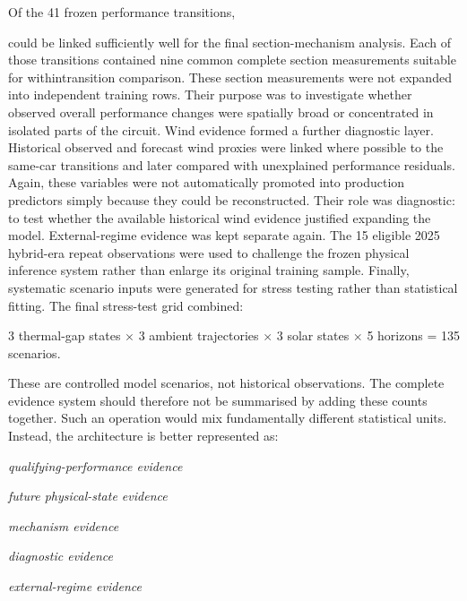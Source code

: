 Of the 41 frozen performance transitions,

could be linked sufficiently well for the final section-mechanism analysis. Each of those transitions contained nine common complete section measurements suitable for withintransition comparison. These section measurements were not expanded into independent training rows. Their purpose was to investigate whether observed overall performance changes were spatially broad or concentrated in isolated parts of the circuit. Wind evidence formed a further diagnostic layer. Historical observed and forecast wind proxies were linked where possible to the same-car transitions and later compared with unexplained performance residuals. Again, these variables were not automatically promoted into production predictors simply because they could be reconstructed. Their role was diagnostic: to test whether the available historical wind evidence justified expanding the model. External-regime evidence was kept separate again. The 15 eligible 2025 hybrid-era repeat observations were used to challenge the frozen physical inference system rather than enlarge its original training sample. Finally, systematic scenario inputs were generated for stress testing rather than statistical fitting. The final stress-test grid combined:

3 thermal-gap states \ensuremath{\times} 3 ambient trajectories \ensuremath{\times} 3 solar states \ensuremath{\times} 5 horizons = 135 scenarios.

These are controlled model scenarios, not historical observations. The complete evidence system should therefore not be summarised by adding these counts together. Such an operation would mix fundamentally different statistical units. Instead, the architecture is better represented as:

\begin{center}\textit{qualifying-performance evidence}\end{center}

\begin{center}\textit{future physical-state evidence}\end{center}

\begin{center}\textit{mechanism evidence}\end{center}

\begin{center}\textit{diagnostic evidence}\end{center}

\begin{center}\textit{external-regime evidence}\end{center}

